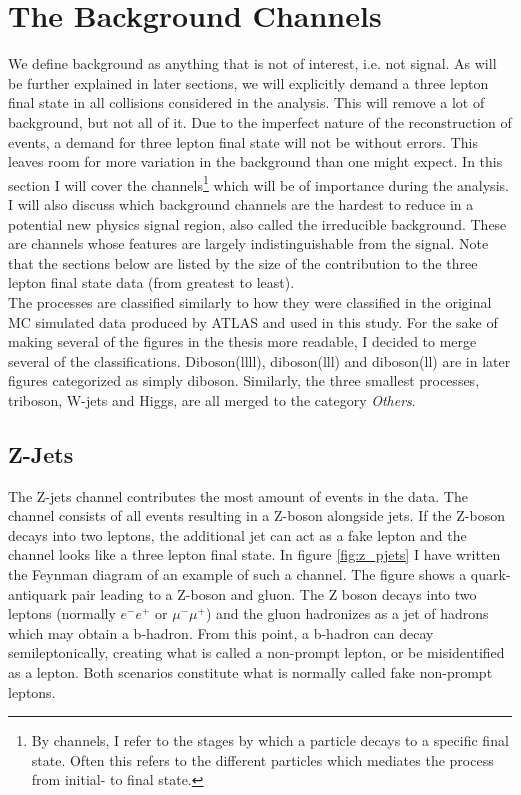 \section{The Background Channels}\label{sec:bkg}
We define background as anything that is not of interest, i.e. not signal. 
As will be further explained in  later sections, we will explicitly demand a three lepton final state in all collisions 
considered in the analysis. This will remove a lot of background, but not all of it. Due to the imperfect nature of the 
reconstruction of events, a demand for three lepton final state will not be without errors. This leaves room for more 
variation in the background than one might expect. In this section I will cover the channels\footnote{By channels,
I refer to the stages by which a particle decays to a specific final state. Often this refers to 
the different particles which mediates the process from initial- to final state.} which will 
be of importance during the analysis. I will also discuss which background channels are the hardest 
to reduce in a potential new physics signal region, also called the irreducible background. These are 
channels whose features are largely indistinguishable from the signal. Note that the sections below
are listed by the size of the contribution to the three lepton final state data (from greatest to least).  
\\
The processes are classified similarly to how they were classified in the original \ac{MC} simulated data produced 
by \ac{ATLAS} and used in this study. For the sake of making several of the figures in the thesis more readable, I decided 
to merge several of the classifications. Diboson(llll), diboson(lll) and diboson(ll) are in later figures categorized as 
simply diboson. Similarly, the three smallest processes, triboson, W-jets and Higgs, are all merged to the category
\emph{Others}.
\subsection*{Z-Jets}
The Z-jets channel contributes the most amount of events in the data. The channel consists of all events
resulting in a Z-boson alongside jets. If the Z-boson decays into two leptons, the additional 
jet can act as a fake lepton and the channel looks like a three lepton final state. In figure \ref{fig:z_pjets} 
I have written the Feynman diagram of an example of such a channel. The figure shows a quark-antiquark pair leading 
to a Z-boson and gluon. The Z boson decays into two leptons (normally $e^-e^+$ or $\mu^- \mu^+$) and the gluon hadronizes 
as a jet of hadrons which may obtain a b-hadron. From this point, a b-hadron can decay semileptonically, creating what is called
a non-prompt lepton, or be misidentified as a lepton. Both scenarios constitute what is normally called fake non-prompt leptons.

